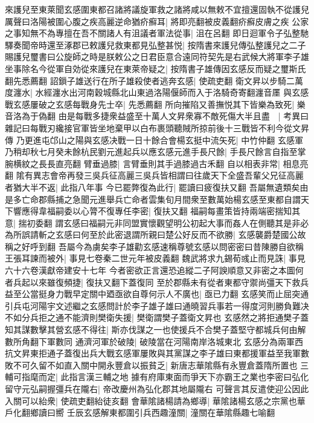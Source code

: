 來護兒至東萊聞玄感圍東都召諸將議旋軍救之諸將咸以無敕不宜擅還固執不從護兒厲聲曰洛陽被圍心腹之疾高麗逆命猶疥癬耳|{
	將即亮翻被皮義翻疥癬皮膚之疾}
公家之事知無不為專擅在吾不關諸人有沮議者軍法從事|{
	沮在呂翻}
即日迴軍令子弘整馳驛奏聞帝時還至涿郡已敕護兒救東都見弘整甚悦|{
	按隋書來護兒傳弘整護兒之二子}
賜護兒璽書曰公旋師之時是朕敕公之日君臣意合遠同符契先是右武候大將軍李子雄坐事除名今從軍自効從來護兒在東萊帝疑之|{
	按隋書子雄傳因玄感反而疑之璽斯氏翻先悉薦翻}
詔鎻子雄送行在所子雄殺使者逃奔玄感|{
	使疏吏翻}
衛文昇以步騎二萬度瀍水|{
	水經瀍水出河南穀城縣北山東過洛陽偃師而入于洛騎奇寄翻瀍音㕓}
與玄感戰玄感屢破之玄感每戰身先士卒|{
	先悉薦翻}
所向摧陷又善撫悦其下皆樂為致死|{
	樂音洛為于偽翻}
由是每戰多捷衆益盛至十萬人文昇衆寡不敵死傷大半且盡　|{
	考異曰雜記曰每戰刃纔接官軍皆坐地棄甲以白布裹頭聽賊所掠前後十三戰皆不利今從文昇傳}
乃更進屯邙山之陽與玄感决戰一日十餘合會楊玄挺中流矢死|{
	中竹仲翻}
玄感軍乃稍却秋七月癸未餘杭民劉元進起兵以應玄感元進手長尺餘|{
	手長尺餘言自指至掌腕横紋之長長直亮翻}
臂垂過膝|{
	言臂垂則其手過膝過古禾翻}
自以相表非常|{
	相息亮翻}
隂有異志會帝再發三吳兵征高麗三吳兵皆相謂曰往歲天下全盛吾輩父兄征高麗者猶大半不返|{
	此指八年事}
今已罷弊復為此行|{
	罷讀曰疲復扶又翻}
吾屬無遺類矣由是多亡命郡縣捕之急聞元進舉兵亡命者雲集旬月間衆至數萬始楊玄感至東都自謂天下響應得韋福嗣委以心膂不復專任李密|{
	復扶又翻}
福嗣每畫策皆持兩端密揣知其意|{
	揣初委翻}
謂玄感曰福嗣元非同盟實懷觀望明公初起大事而姦人在側聽其是非必為所誤請斬之玄感曰何至於此密退謂所親曰楚公好反而不欲勝|{
	玄感襲爵楚國公故稱之好呼到翻}
吾屬今為虜矣李子雄勸玄感速稱尊號玄感以問密密曰昔陳勝自欲稱王張耳諫而被外|{
	事見七卷秦二世元年被皮義翻}
魏武將求九錫荀彧止而見誅|{
	事見六十六卷漢獻帝建安十七年}
今者密欲正言還恐追縱二子阿諛順意又非密之本圖何者兵起以來雖復頻捷|{
	復扶又翻下蓋復同}
至於郡縣未有從者東都守禦尚彊天下救兵益至公當挺身力戰早定關中廼亟欲自尊何示人不廣也|{
	亟已力翻}
玄感笑而止屈突通引兵屯河陽宇文述繼之玄感問計於李子雄子雄曰通曉習兵事若一得度河則勝負難决不如分兵拒之通不能濟則樊衛失援|{
	樊衛謂樊子蓋衛文昇也}
玄感然之將拒通樊子蓋知其謀數擊其營玄感不得往|{
	斯亦伐謀之一也使援兵不合樊子蓋堅守都城兵何由解數所角翻下軍數同}
通濟河軍於破陵|{
	破陵當在河陽南岸洛城東北}
玄感分為兩軍西抗文昇東拒通子蓋復出兵大戰玄感軍屢敗與其黨謀之李子雄曰東都援軍益至我軍數敗不可久留不如直入關中開永豐倉以振貧乏|{
	新唐志華隂縣有永豐倉蓋隋所置也}
三輔可指麾而定|{
	此指言漢三輔之地}
據有府庫東面而爭天下亦霸王之業也李密曰弘化留守元弘嗣握彊兵在隴右|{
	帝改慶州為弘化郡其地屬隴右}
可聲言其反遣使迎公因此入關可以紿衆|{
	使疏吏翻紿徒亥翻}
會華隂諸楊請為鄉導|{
	華隂諸楊玄感之宗黨也華戶化翻鄉讀曰嚮}
壬辰玄感解東都圍引兵西趣潼關|{
	潼關在華隂縣趣七喻翻}
